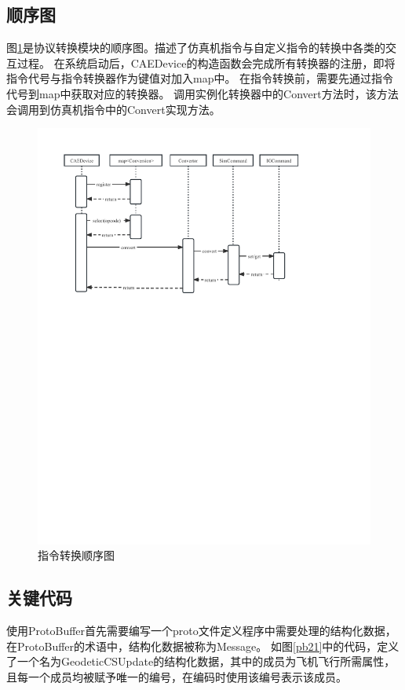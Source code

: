 \subsection{顺序图}
图\ref{seq2}是协议转换模块的顺序图。描述了仿真机指令与自定义指令的转换中各类的交互过程。
在系统启动后，CAEDevice的构造函数会完成所有转换器的注册，即将指令代号与指令转换器作为键值对加入map中。
在指令转换前，需要先通过指令代号到map中获取对应的转换器。
调用实例化转换器中的Convert方法时，该方法会调用到仿真机指令中的Convert实现方法。
\begin{figure}[h!]
    \begin{center}
        \includegraphics[width=\textwidth]{pictures/sequence2.pdf}
        \caption{指令转换顺序图}
        \label{seq2}
    \end{center}
\end{figure}
\subsection{关键代码}
使用ProtoBuffer首先需要编写一个proto文件定义程序中需要处理的结构化数据，在ProtoBuffer的术语中，结构化数据被称为Message。
如图\ref{pb21}中的代码，定义了一个名为GeodeticCSUpdate的结构化数据，其中的成员为飞机飞行所需属性，且每一个成员均被赋予唯一的编号，在编码时使用该编号表示该成员。

